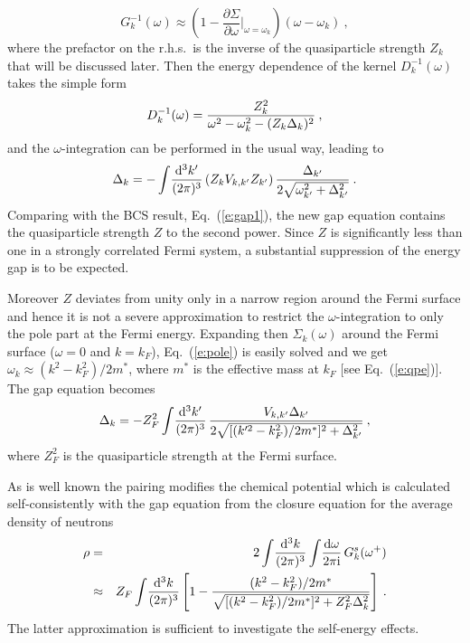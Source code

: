 \documentclass[runningheads]{svmult}
\newcommand{\be}{\begin{equation}}
\newcommand{\ee}{\end{equation}}
\newcommand{\bea}{\begin{eqnarray}}
\newcommand{\eea}{\end{eqnarray}}
\def\de{\Delta}
\def\sig{\Sigma}
\def\om{\omega}
\begin{document}
\be
 G^{-1}_k(\om) \approx 
 \left( 1 - \frac{\partial\sig}{\partial\om} \Big|_{\om=\om_k} 
 \right)(\om - \om_k)  \:,
\ee
where the prefactor on the r.h.s.~is the inverse  
of the quasiparticle strength $Z_k$ that will be discussed later.
Then the energy dependence of the kernel $D^{-1}_k(\om)$ 
takes the simple form
\be
 D^{-1}_k(\om) = { Z_k^2 \over \om^2 - \om_k^2 - (Z_k\Delta_k)^2 }  \:,
\ee 
and the $\om$-integration can be performed in the usual way,
leading to 
\be
 \de_{k} = - \int\! \frac{\D^3 k'}{(2\pi)^3} 
 \left( Z_k V_{k,k'} Z_{k'} \right) 
 \frac{ %
 \de_{k'}}{2\sqrt{\om_{k'}^2 + \de_{k'}^2}}  \:.
\label{e:GE}
\ee
Comparing with the BCS result, Eq.~(\ref{e:gap1}), the new gap equation 
contains the quasiparticle strength $Z$ to the second power. 
Since $Z$  
is significantly less than one in a strongly correlated Fermi system, 
a substantial suppression of the energy gap is to be expected.  

Moreover $Z$ deviates from unity only in a narrow region around the Fermi
surface and hence it is not a severe approximation  
to restrict the $\om$-integration to only the pole part at the Fermi energy.  
Expanding then $\Sigma_k(\om)$ around the Fermi surface 
($\om=0$ and $k=k_F$),
Eq.~(\ref{e:pole}) is easily solved and we get 
$\om_k \approx (k^2 - k_F^2)/2m^*$,
where $m^*$ is the effective mass at $k_F$ [see Eq.~(\ref{e:qpe})]. 
The gap equation becomes
\be
 \de_k = - Z_F^2 \int\!{\frac{\D^3 k'}{(2\pi)^3}} \,\frac{V_{k,k'}\de_{k'}}
 {2\sqrt{[(k'^2-k_F^2)/2m^*]^2 + \de_{k'}^2}}  \:,
\label{e:ZZ1}
\ee
where $Z_F^2$ is the quasiparticle strength at the Fermi surface.

As is well known the pairing modifies the chemical potential which is 
calculated self-consistently with the gap equation from the closure equation
for the average density of neutrons
\bea 
 \rho &=& 2\int\!\frac{\D^3 k}{(2\pi)^3} \int\!\frac{\D\om}{2\pi \I} 
 \, G_k^{s}(\om^+)
\\
 &\approx& Z_F \int\!\frac{\D^3 k}{(2\pi)^3} 
 \left[ 1 - \frac{(k^2-k_F^2)/2m^*}{\sqrt{[(k^2-k_F^2)/2m^*]^2 
 + Z_F^2 \de_k^2}} \right]  \:.
\label{e:ZZ2}
\eea
The latter approximation is sufficient to investigate the self-energy effects. 
\end{document}
